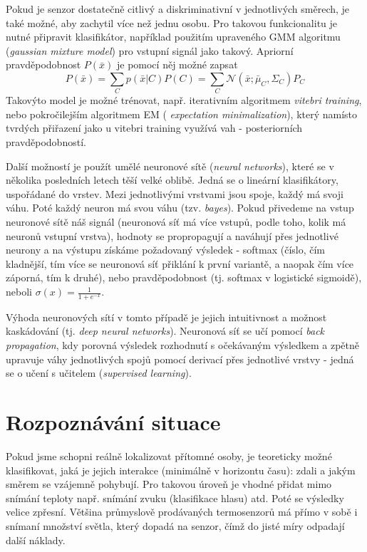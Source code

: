 \documentclass[10pt,a4paper,titlepage]{article}
\begin{document}
  Pokud je senzor dostatečně citlivý a diskriminativní v jednotlivých směrech, je také možné, aby zachytil
  více než jednu osobu. Pro takovou funkcionalitu je nutné připravit klasifikátor, například použitím
  upraveného GMM algoritmu ({\it gaussian mixture model}) pro vstupní signál jako takový. Apriorní
  pravděpodobnost $P(\bar{x})$ je pomocí něj možné zapsat $$P(\bar{x}) = \sum_{C} p(\bar{x} | C)
  P(C) = \sum_{C} \mathcal{N}(\bar{x}; \bar{\mu}_C,\Sigma_C) P_C$$ Takovýto model je možné trénovat,
  např. iterativním algoritmem {\it vitebri training}, nebo pokročilejším algoritmem EM ({\it
  expectation minimalization}), který namísto tvrdých přiřazení jako u vitebri training využívá vah
  - posteriorních pravděpodobností.

  Další možností je použít umělé neuronové sítě ({\it neural networks}), které se v několika posledních
  letech těší velké oblibě. Jedná se o lineární klasifikátory, uspořádané do vrstev. Mezi jednotlivými
  vrstvami jsou spoje, každý má svoji váhu. Poté každý neuron má svou váhu (tzv. {\it bayes}). Pokud
  přivedeme na vstup neuronové sítě náš signál (neuronová síť má více vstupů, podle toho, kolik má
  neuronů vstupní vrstva), hodnoty se propropagují a naváhují přes jednotlivé neurony a na výstupu
  získáme požadovaný výsledek - softmax (číslo, čím kladnější, tím více se neuronová síť přiklání
  k první variantě, a naopak čím více záporná, tím k druhé), nebo pravděpodobnost (tj. softmax v
  logistické sigmoidě), neboli $\sigma(x) = \frac{1}{1 + e^{-x}}$.

  Výhoda neuronových sítí v tomto případě je jejich intuitivnost a možnost kaskádování (tj. {\it
  deep neural networks}). Neuronová síť se učí pomocí {\it back propagation}, kdy porovná výsledek
  rozhodnutí s očekávaným výsledkem a zpětně upravuje váhy jednotlivých spojů pomocí derivací přes
  jednotlivé vrstvy - jedná se o učení s učitelem ({\it supervised learning}).

  \section{Rozpoznávání situace}
  Pokud jsme schopni reálně lokalizovat přítomné osoby, je teoreticky možné klasifikovat, jaká je jejich
  interakce (minimálně v horizontu času): zdali a jakým směrem se vzájemně pohybují. Pro takovou
  úroveň je vhodné přidat mimo snímání teploty např. snímání zvuku (klasifikace hlasu) atd.
  Poté se výsledky velice zpřesní. Většina průmyslově prodávaných termosenzorů má přímo v sobě
  i snímaní množství světla, který dopadá na senzor, čímž do jisté míry odpadají další náklady.
  
\end{document}

